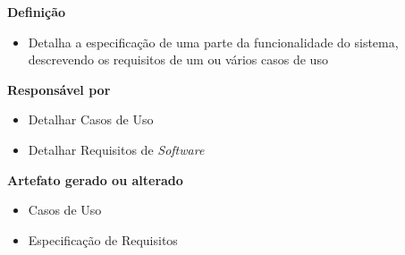 \textbf{Definição}
\begin{itemize}
\item Detalha a especificação de uma parte da funcionalidade do sistema, descrevendo os requisitos de um ou vários casos de uso
\end{itemize}

\textbf{Responsável por}
\begin{itemize}
\item Detalhar Casos de Uso
\item Detalhar Requisitos de \textit{Software}
\end{itemize}

\textbf{Artefato gerado ou alterado}
\begin{itemize}
\item Casos de Uso
\item Especificação de Requisitos
\end{itemize}
